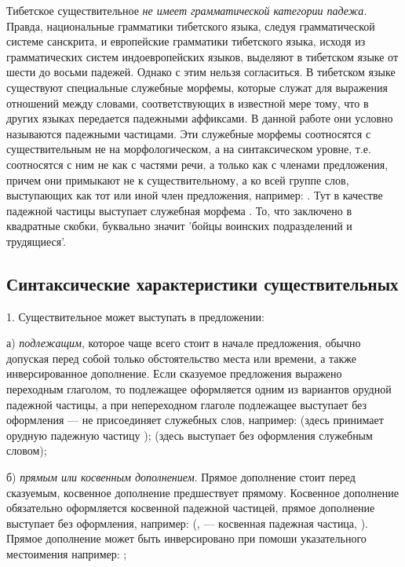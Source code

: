 Тибетское существительное \emph{не имеет грамматической категории падежа}. Правда, национальные грамматики тибетского языка, следуя грамматической системе санскрита, и европейские грамматики тибетского языка, исходя из грамматических систем индоевропейских языков, выделяют в тибетском языке от шести до восьми падежей. Однако с этим нельзя согласиться. В тибетском языке существуют специальные служебные морфемы, которые служат для выражения отношений между словами, соответствующих в известной мере тому, что в других языках передается падежными аффиксами. В данной работе они условно называются падежными частицами. Эти служебные морфемы соотносятся с существительным не на морфологическом, а на синтаксическом уровне, т.е. соотносятся с ним не как с частями речи, а только как с членами предложения, причем они примыкают не к существительному, а ко всей группе слов, выступающих как тот или иной член предложения, например:
. Тут в качестве падежной частицы выступает
служебная морфема . То, что заключено в квадратные скобки, буквально значит 'бойцы воинских подразделений и трудящиеся'.

\subsection{Синтаксические характеристики существительных}

1. Существительное может выступать в предложении:

а) \emph{подлежащим}, которое чаще всего стоит в начале предложения, обычно допуская перед собой только обстоятельство места или времени, а также инверсированное дополнение. Если сказуемое предложения выражено переходным глаголом, то подлежащее оформляется одним из вариантов орудной падежной частицы, а при непереходном глаголе подлежащее выступает без оформления --- не присоединяет служебных слов, например:
 (здесь   принимает орудную падежную частицу );
 (здесь  выступает без оформления служебным словом);

б) \emph{прямым или косвенным дополнением}. Прямое дополнение стоит перед сказуемым, косвенное дополнение предшествует прямому. Косвенное дополнение обязательно оформляется косвенной падежной частицей, прямое дополнение выступает без оформления, например:
 (,  --- косвенная падежная частица, ). Прямое дополнение может быть инверсировано при помоши указательного местоимения  например:
;

